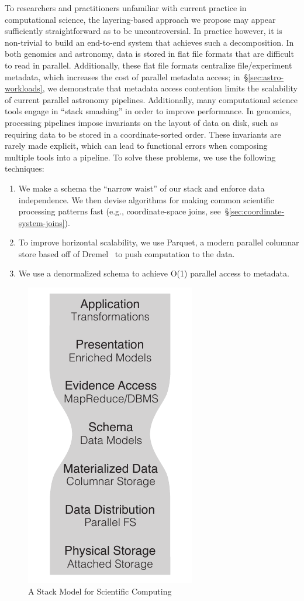 \documentclass{acm_proc_article-sp}
\begin{document}
To researchers and practitioners unfamiliar with current practice in computational science, the layering-based approach
we propose may appear sufficiently straightforward as to be uncontroversial. In practice however, it is non-trivial to build
an end-to-end system that achieves such a decomposition. In both genomics and astronomy, data is stored in flat file
formats that are difficult to read in parallel. Additionally, these flat file formats centralize file/experiment metadata,
which increases the cost of parallel metadata access; in~\S\ref{sec:astro-workloads}, we demonstrate that metadata
access contention limits the scalability of current parallel astronomy pipelines. Additionally, many computational science
tools engage in ``stack smashing'' in order to improve performance. In genomics, processing pipelines impose invariants
on the layout of data on disk, such as requiring data to be stored in a coordinate-sorted order. These invariants are
rarely made explicit, which can lead to functional errors when composing multiple tools into a pipeline. To solve these
problems, we use the following techniques:

\begin{enumerate}
\item We make a schema the ``narrow waist'' of our stack and enforce data independence. We then
devise algorithms for making common scientific processing patterns fast (e.g., coordinate-space joins,
see~\S\ref{sec:coordinate-system-joins}).
\item To improve horizontal scalability, we use Parquet, a modern parallel columnar store based off of
Dremel~\cite{melnik10} to push computation to the data.
\item We use a denormalized schema to achieve O(1) parallel access to metadata.
\end{enumerate}

\begin{figure}[h]
\begin{center}
\includegraphics[width=0.4\linewidth]{stack-model-2.pdf}
\end{center}
\caption{A Stack Model for Scientific Computing}
\label{fig:stack-model}
\end{figure}
\end{document}

